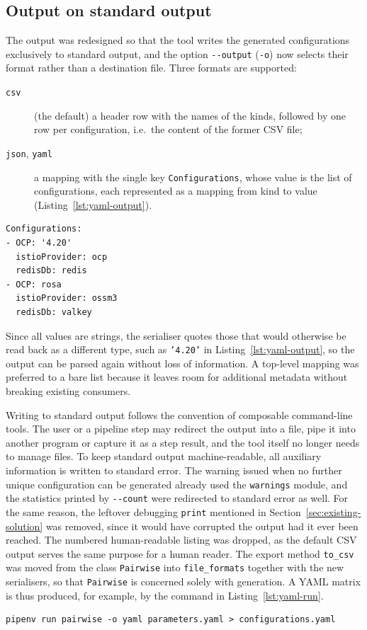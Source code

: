 \documentclass[
  digital, %
  oneside, %
  lof,     %
  nolot,     %
]{fithesis4}
\begin{document}
\subsection{Output on standard output}
The output was redesigned so that the tool writes the generated configurations
exclusively to standard output, and the option \texttt{-{}-output} (\texttt{-o})
now selects their format rather than a destination file. Three formats are
supported:
%
\begin{description}
  \item[\texttt{csv}] (the default) a header row with the names of the kinds,
        followed by one row per configuration, i.e.\ the content of the former
        \gls{CSV} file;
  \item[\texttt{json}, \texttt{yaml}] a mapping with the single key
        \texttt{Configurations}, whose value is the list of configurations, each
        represented as a mapping from kind to value
        (Listing~\ref{lst:yaml-output}).
\end{description}
%
\begin{lstlisting}[caption={Generated configurations in the YAML output format (abridged).},label={lst:yaml-output}]
Configurations:
- OCP: '4.20'
  istioProvider: ocp
  redisDb: redis
- OCP: rosa
  istioProvider: ossm3
  redisDb: valkey
\end{lstlisting}
%
Since all values are strings, the serialiser quotes those that would otherwise
be read back as a different type, such as \texttt{'4.20'} in
Listing~\ref{lst:yaml-output}, so the output can be parsed again without loss of
information. A top-level mapping was preferred to a bare list because it leaves
room for additional metadata without breaking existing consumers.

Writing to standard output follows the convention of composable command-line
tools. The user or a pipeline step may redirect the output into a file, pipe it
into another program or capture it as a step result, and the tool itself no
longer needs to manage files. To keep standard output machine-readable, all
auxiliary information is written to standard error. The warning issued when no
further unique configuration can be generated already used the
\texttt{warnings} module, and the statistics printed by \texttt{-{}-count} were
redirected to standard error as well. For the same reason, the leftover
debugging \texttt{print} mentioned in Section~\ref{sec:existing-solution} was
removed, since it would have corrupted the output had it ever been reached. The
numbered human-readable listing was dropped, as the default \gls{CSV} output
serves the same purpose for a human reader. The export method \texttt{to\_csv}
was moved from the class \texttt{Pairwise} into \texttt{file\_formats} together
with the new serialisers, so that \texttt{Pairwise} is concerned solely with
generation. A \gls{YAML} matrix is thus produced, for example, by the command
in Listing~\ref{lst:yaml-run}.
%
\begin{lstlisting}[caption={Generating configurations in YAML.},label={lst:yaml-run}]
pipenv run pairwise -o yaml parameters.yaml > configurations.yaml
\end{lstlisting}
\end{document}
